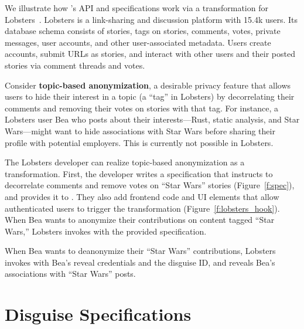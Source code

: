 We illustrate how \sys's API and \xx specifications work via a \xxing
transformation for Lobsters~\cite{lobsters}.  Lobsters is a
link-sharing and discussion platform with 15.4k
users.
%
Its database schema consists of stories, tags on stories, comments, votes,
private messages, user accounts, and other user-associated metadata.
%
Users create accounts, submit URLs as stories, and interact with other users
and their posted stories via comment threads and votes.
%

Consider \textbf{topic-based anonymization}, a desirable privacy feature that allows users to
hide their interest in a topic (a ``tag'' in Lobsters) by decorrelating
their comments and removing their votes on stories with that tag.
%
For instance, a Lobsters user Bea who posts about their interests---Rust,
static analysis, and Star Wars---might want to hide associations with
Star Wars before sharing their profile with potential employers.
%
This is currently not possible in Lobsters.

%
The Lobsters developer can realize topic-based anonymization as a \xxing
transformation.
%
First, the developer writes a \xx specification that instructs \sys to
decorrelate comments and remove votes on ``Star Wars'' stories
(Figure~\ref{f:spec}), and provides it to \sys.
%
They also add frontend code and UI elements that allow authenticated users to
trigger the \xxing transformation (Figure~\ref{f:lobsters_hook}).
%
When Bea wants to anonymize their contributions on content tagged ``Star Wars,''
Lobsters invokes \sys with the provided specification.

%
When Bea wants to deanonymize their ``Star Wars'' contributions, Lobsters
invokes \sys with Bea's reveal credentials and the disguise ID, and \sys reveals
Bea's associations with ``Star Wars'' posts.
%


\section{Disguise Specifications}
\label{s:spec}

